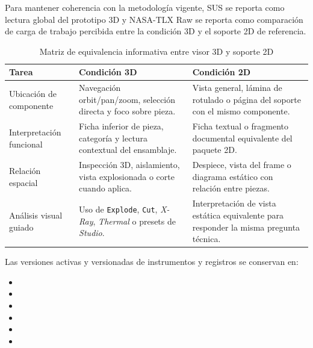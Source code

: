 \noindent Para mantener coherencia con la metodología vigente, SUS se reporta como lectura global del prototipo 3D y NASA-TLX Raw se reporta como comparación de carga de trabajo percibida entre la condición 3D y el soporte 2D de referencia.

\begin{table}[H]
    \caption{Matriz de equivalencia informativa entre visor 3D y soporte 2D}
    \label{tab:equivalencia_soporte_2d_visor_3d}
    \centering
    \scriptsize\singlespacing
    \begin{tabular}{p{3.4cm}p{4.7cm}p{4.7cm}}
        \hline
        \textbf{Tarea} & \textbf{Condición 3D} & \textbf{Condición 2D} \\ \hline
        Ubicación de componente & Navegación orbit/pan/zoom, selección directa y foco sobre pieza. & Vista general, lámina de rotulado o página del soporte con el mismo componente. \\
        Interpretación funcional & Ficha inferior de pieza, categoría y lectura contextual del ensamblaje. & Ficha textual o fragmento documental equivalente del paquete 2D. \\
        Relación espacial & Inspección 3D, aislamiento, vista explosionada o corte cuando aplica. & Despiece, vista del frame o diagrama estático con relación entre piezas. \\
        Análisis visual guiado & Uso de \texttt{Explode}, \texttt{Cut}, \textit{X-Ray}, \textit{Thermal} o presets de \textit{Studio}. & Interpretación de vista estática equivalente para responder la misma pregunta técnica. \\ \hline
    \end{tabular}
    \par\vspace{0.5\baselineskip}
\end{table}

\noindent Las versiones activas y versionadas de instrumentos y registros se conservan en:
\begin{itemize}
    \item {}
    \item {}
    \item {}
    \item {}
    \item {}
    \item {}
\end{itemize}

